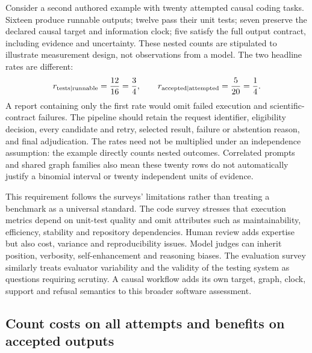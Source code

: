 Consider a second authored example with twenty attempted causal coding tasks.
Sixteen produce runnable outputs; twelve pass their unit tests; seven preserve
the declared causal target and information clock; five satisfy the full output
contract, including evidence and uncertainty. These nested counts are stipulated
to illustrate measurement design, not observations from a model. The two
headline rates are different:
\begin{equation}
 r_{\rm tests\mid runnable}=\frac{12}{16}=\frac34,
 \qquad
 r_{\rm accepted\mid attempted}=\frac5{20}=\frac14.
 \label{exec19:evalcode-denominators}
\end{equation}
A report containing only the first rate would omit failed execution and
scientific-contract failures. The pipeline should retain the request identifier,
eligibility decision, every candidate and retry, selected result, failure or
abstention reason, and final adjudication. The rates need not be multiplied
under an independence assumption: the example directly counts nested outcomes.
Correlated prompts and shared graph families also mean these twenty rows do
not automatically justify a binomial interval or twenty independent units of
evidence.~\citep{exec19_surveys_reference}

This requirement follows the surveys' limitations rather than treating a
benchmark as a universal standard. The code survey stresses that execution
metrics depend on unit-test quality and omit attributes such as maintainability,
efficiency, stability and repository dependencies. Human review adds expertise
but also cost, variance and reproducibility issues. Model judges can inherit
position, verbosity, self-enhancement and reasoning biases. The evaluation
survey similarly treats evaluator variability and the validity of the testing
system as questions requiring scrutiny. A causal workflow adds its own
target, graph, clock, support and refusal semantics to this broader software
assessment.~\citep{exec19_surveys_code,exec19_surveys_evaluation}

\subsection{Count costs on all attempts and benefits on accepted outputs}
\label{exec19:evalcode-cost}

